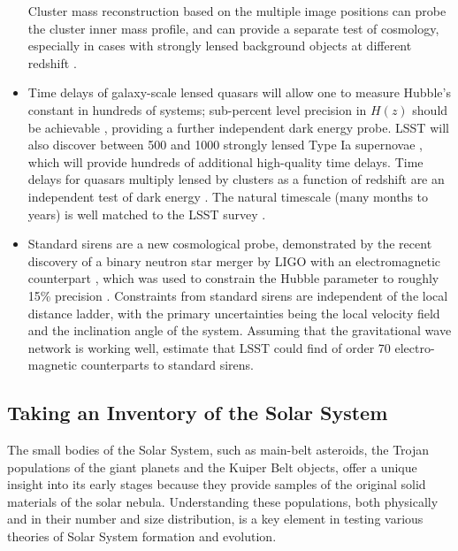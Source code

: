 \begin{itemize}
Cluster mass reconstruction based on the multiple image positions
 can probe the cluster inner mass profile, and can provide a separate test of cosmology, especially
in cases with strongly lensed background objects at different redshift \citep{2000ApJ...532..679P,2003MNRAS.338L..25O}.
\item Time delays of galaxy-scale lensed quasars will allow one to measure Hubble's constant
\citep[e.g.,][]{2010ApJ...711..201S,2017MNRAS.465.4914B} in hundreds of systems; sub-percent level precision in
$H(z)$ should be achievable \citep{2009ApJ...706...45C,2016A&ARv..24...11T}, providing a further independent dark energy probe.
LSST will also discover between 500 and 1000 strongly lensed Type Ia supernovae \citep{2017ApJ...834L...5G,2018ApJ...855...22G}, which will provide hundreds of additional high-quality time delays.
Time delays for quasars multiply lensed by clusters as a function of redshift are an independent test
of dark energy \citep{1997ApJ...482...75K}. The natural timescale (many months to years) is well matched
to the LSST survey \citep{2010MNRAS.405.2579O}.
\item Standard sirens are a new cosmological probe, demonstrated by the recent discovery of a binary
  neutron star merger by LIGO with an electromagnetic counterpart \citep{2017ApJ...848L..12A}, which was
  used to constrain the Hubble parameter to roughly 15\% precision \citep{2017Natur.551...85A}.
  Constraints from standard sirens are independent of the local distance ladder, with the primary
  uncertainties being the local velocity field and the inclination angle of the system.  Assuming that
  the gravitational wave network is working well, \citet{2018ApJ...852L...3S}
  estimate that LSST could find of order 70 electro-magnetic counterparts to standard sirens.
\end{itemize}


\subsection{Taking an Inventory of the Solar System}

The small bodies of the Solar System, such as main-belt asteroids,
the Trojan populations of the giant planets and the Kuiper Belt objects,
offer a unique insight into its early stages because they provide
samples of the original solid materials of the solar nebula.
Understanding these populations, both physically and in their number
and size distribution, is a key element in testing various theories of
Solar System formation and evolution.

